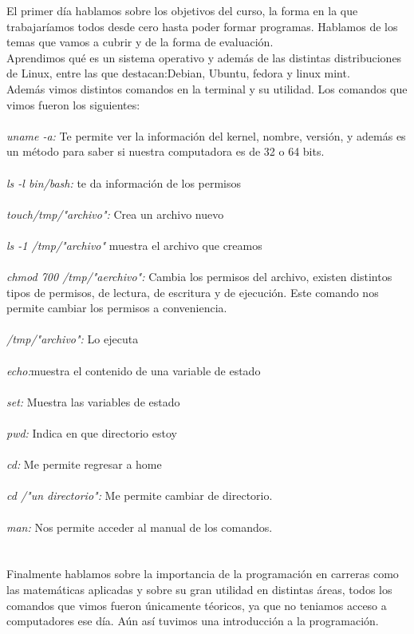 \documentclass{book}
\begin{document}
El primer día hablamos sobre los objetivos del curso, la forma en la que trabajaríamos todos desde cero hasta poder formar programas. Hablamos de los temas que vamos a cubrir y de la forma de evaluación.\\
Aprendimos qué es un sistema operativo y además de las distintas distribuciones de Linux, entre las que destacan:Debian, Ubuntu, fedora y linux mint.\\
Además vimos distintos comandos en la terminal y su utilidad. Los comandos que vimos fueron los siguientes: \\
\\
\textit{uname -a:} Te permite ver la información del kernel, nombre, versión, y además es un método para saber si nuestra computadora es de 32 o 64 bits. \\
\\
\textit{ls -l bin/bash:} te da información de los permisos\\
\\
\textit{touch/tmp/"archivo":} Crea un archivo nuevo\\
\\
\textit{ls -1 /tmp/"archivo"}  muestra el archivo que creamos\\
\\
\textit{chmod 700 /tmp/"aerchivo":} Cambia los permisos del archivo, existen distintos tipos de permisos, de lectura, de escritura y de ejecución. Este comando nos permite cambiar los permisos a conveniencia. \\
\\
\textit{/tmp/"archivo":} Lo ejecuta\\
\\
\textit{echo:}muestra el contenido de una variable de estado\\
\\
\textit{set:} Muestra las variables de estado\\
\\
\textit{pwd:} Indica en que directorio estoy\\
\\
\textit{cd:} Me permite regresar a home\\
\\
\textit{cd /"un directorio":} Me permite cambiar de directorio.\\
\\
\textit{man:} Nos permite acceder al manual de los comandos.\\
\\
\\
Finalmente hablamos sobre la importancia de la programación en carreras como las matemáticas aplicadas y sobre su gran utilidad en distintas áreas, todos los comandos que vimos fueron únicamente téoricos, ya que no teniamos acceso a computadores ese día. Aún así tuvimos una introducción a la programación.
\end{document}
